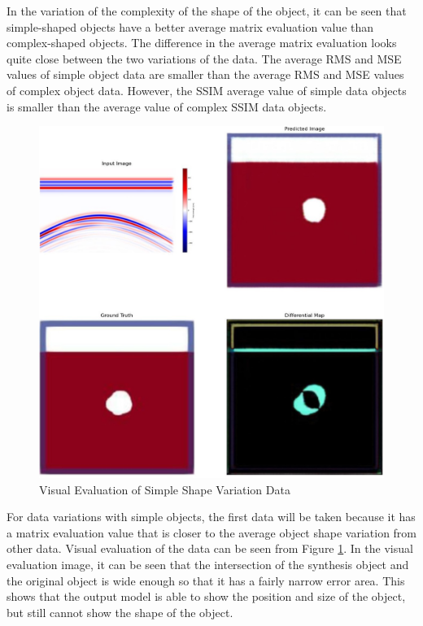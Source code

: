 \documentclass[conference]{IEEEtran}
\begin{document}
In the variation of the complexity of the shape of the object, it can be seen that simple-shaped objects have a better average matrix evaluation value than complex-shaped objects.
The difference in the average matrix evaluation looks quite close between the two variations of the data.
The average RMS and MSE values of simple object data are smaller than the average RMS and MSE values of complex object data.
However, the SSIM average value of simple data objects is smaller than the average value of complex SSIM data objects.

\begin{figure}[ht]
  \centering
  \includegraphics[scale=0.15]{gambar/diffMapSederhana.jpg}
  \caption{Visual Evaluation of Simple Shape Variation Data}
  \label{fig:diffmapsederhana}
\end{figure}

For data variations with simple objects, the first data will be taken because it has a matrix evaluation value that is closer to the average object shape variation from other data.
Visual evaluation of the data can be seen from Figure \ref{fig:diffmapsederhana}.
In the visual evaluation image, it can be seen that the intersection of the synthesis object and the original object is wide enough so that it has a fairly narrow error area.
This shows that the output model is able to show the position and size of the object, but still cannot show the shape of the object.
\end{document}
